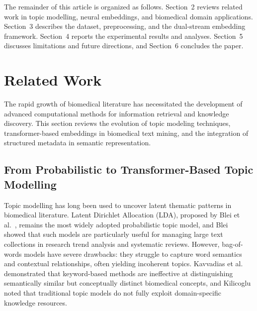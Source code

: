 \documentclass[authorproof,JACIII,researchpaper]{fujipressarticle}
\begin{document}
The remainder of this article is organized as follows. Section~2 reviews related work in topic modelling, neural embeddings, and biomedical domain applications. Section~3 describes the dataset, preprocessing, and the dual-stream embedding framework. Section~4 reports the experimental results and analyses. Section~5 discusses limitations and future directions, and Section~6 concludes the paper.

\section{Related Work}

The rapid growth of biomedical literature has necessitated the development of advanced computational methods for information retrieval and knowledge discovery. This section reviews the evolution of topic modeling techniques, transformer-based embeddings in biomedical text mining, and the integration of structured metadata in semantic representation.

\subsection{From Probabilistic to Transformer-Based Topic Modelling}

Topic modelling has long been used to uncover latent thematic patterns in biomedical literature. Latent Dirichlet Allocation (LDA), proposed by Blei et al.~\cite{blei_latent_2003}, remains the most widely adopted probabilistic topic model, and Blei~\cite{blei_probabilistic_2012} showed that such models are particularly useful for managing large text collections in research trend analysis and systematic reviews. However, bag-of-words models have severe drawbacks: they struggle to capture word semantics and contextual relationships, often yielding incoherent topics. Kavvadias et al.~\cite{kavvadias_supporting_2020} demonstrated that keyword-based methods are ineffective at distinguishing semantically similar but conceptually distinct biomedical concepts, and Kilicoglu~\cite{kilicoglu_biomedical_2018} noted that traditional topic models do not fully exploit domain-specific knowledge resources.
\end{document}
